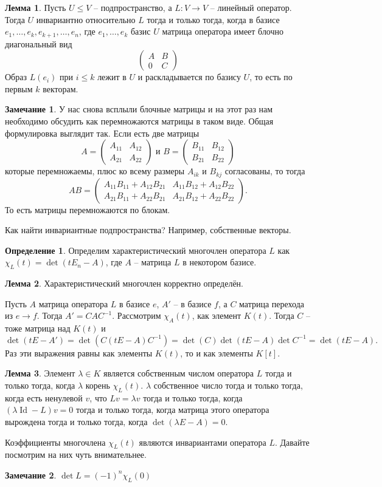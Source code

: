 \documentclass[10pt,a4paper,oneside]{book}
\theoremstyle{definition}
\newtheorem*{rem}{Замечание}
\newtheorem*{defn}{Определение}
\newtheorem{lem}{Лемма}
\newcommand{\id}{\operatorname{Id}}
\def\dfn{\begin{defn}}
\def\edfn{\end{defn}}
\def\lm{\begin{lem}}
\def\elm{\end{lem}}
\def\rm{\begin{rem}}
\def\erm{\end{rem}}
\def\pmat{\begin{pmatrix}}
\def\epmat{\end{pmatrix}}
\begin{document}
\lm Пусть $U\leq V$ -- подпространство, а $L \colon V \to V$ -- линейный оператор. Тогда $U$ инвариантно относительно $L$ тогда и только тогда, когда в базисе $e_1,\dots,e_k,e_{k+1},\dots,e_n$, где $e_1,\dots,e_k$ базис $U$ матрица оператора имеет блочно диагональный вид
$$\pmat A&B\\
0&C \epmat$$
\proof Образ $L(e_i)$ при $i \leq k$ лежит в $U$ и раскладывается по базису $U$, то есть по первым $k$ векторам.
\endproof
\elm


\rm У нас снова всплыли блочные матрицы и на этот раз нам необходимо обсудить как перемножаются матрицы в таком виде. Общая формулировка выглядит так. Если есть две матрицы
$$A=\pmat A_{11} & A_{12}\\
A_{21}& A_{22}
\epmat \text{ и } B=\pmat B_{11} & B_{12}\\
B_{21}& B_{22}
\epmat $$
которые перемножаемы, плюс ко всему размеры $A_{ik}$ и $B_{kj}$ согласованы, то тогда
$$AB= \pmat A_{11}B_{11}+ A_{12}B_{21} & A_{11}B_{12}+ A_{12}B_{22}\\
A_{21}B_{11}+ A_{22}B_{21}& A_{21}B_{12}+ A_{22}B_{22}\epmat. $$
То есть матрицы перемножаются по блокам.
\erm

Как найти инвариантные подпространства? Например, собственные векторы.

\dfn Определим характеристический многочлен оператора $L$ как $\chi_L(t)=\det(tE_n - A)$, где $A$ -- матрица $L$ в некотором базисе.
\edfn

\lm Характеристический многочлен корректно определён.
\elm
\proof Пусть $A$ матрица оператора $L$ в базисе $e$, $A'$ -- в базисе $f$, а $C$ матрица перехода из $e\to f$. Тогда $A'=CAC^{-1}$. Рассмотрим $\chi_A(t)$, как элемент $K(t)$. Тогда $C$ -- тоже матрица над $K(t)$ и
$$\det(tE-A')=\det(C(tE-A)C^{-1})=\det(C)\det(tE-A)\det C^{-1}=\det(tE-A).$$
Раз эти выражения равны как элементы $K(t)$, то и как элементы $K[t]$.
\endproof

\lm Элемент $\lambda \in K$ является собственным числом оператора $L$ тогда и только тогда, когда $\lambda$ корень $\chi_L(t)$.
\proof $\lambda$ собственное число тогда и только тогда, когда есть ненулевой $v$, что $Lv=\lambda v$ тогда и только тогда, когда $(\lambda \id - L)v=0$ тогда и только тогда, когда матрица этого оператора вырождена тогда и только тогда, когда $\det (\lambda E- A) =0$.
\endproof
\elm


Коэффициенты многочлена $\chi_L(t)$ являются инвариантами оператора $L$. Давайте посмотрим на них чуть внимательнее.
\rm $\det L = (-1)^{n} \chi_L(0)$
\erm
\end{document}
